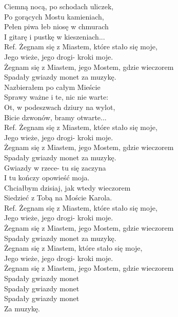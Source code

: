 
Ciemną nocą, po schodach uliczek, \tab{} \\
Po gorących Mostu kamieniach,  \tab{} \\
Pełen piwa łeb niosę w chmurach  \tab{} \\
I gitarę i pustkę w kieszeniach...  \tab{} \\
\hops
Ref. Żegnam się z Miastem, które stało się moje, \\
 Jego wieże, jego drogi- kroki moje.  \tab{} \\
 Żegnam się z Miastem, jego Mostem, gdzie wieczorem \\
 Spadały gwiazdy monet za muzykę. \tab{}  \\
\hops
Nazbierałem po całym Mieście \\
Sprawy ważne i te, nic nie warte: \\
Ot, w podeszwach dziury na wylot, \\
Bicie dzwonów, bramy otwarte... \\
\hops
Ref. Żegnam się z Miastem, które stało się moje,\\
 Jego wieże, jego drogi- kroki moje. \\
 Żegnam się z Miastem, jego Mostem, gdzie wieczorem \\
 Spadały gwiazdy monet za muzykę. \\
\hops
Gwiazdy w rzece- tu się zaczyna \\
I tu kończy opowieść moja. \\
Chciałbym dzisiaj, jak wtedy wieczorem \\
Siedzieć z Tobą na Moście Karola. \\
\hops
Ref. Żegnam się z Miastem, które stało się moje,\\
 Jego wieże, jego drogi- kroki moje. \\
 Żegnam się z Miastem, jego Mostem, gdzie wieczorem \\
 Spadały gwiazdy monet za muzykę. \\
\hops
{} Żegnam się z Miastem, które stało się moje, \\
 Jego wieże, jego drogi- kroki moje. \\
 Żegnam się z Miastem, jego Mostem, gdzie wieczorem \\
 Spadały gwiazdy monet \tab{}\tab{}  \\
 Spadały gwiazdy monet \tab{}\tab{} \\
 Spadały gwiazdy monet \tab{}\tab{} \\
 Za muzykę. \tab{}\tab{} 